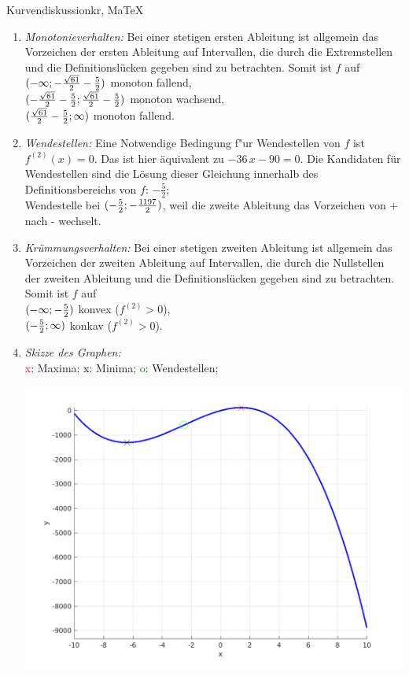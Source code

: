 \begin{MAufgabe}{Kurvendiskussion}{kr, MaTeX}
\begin{enumerate}
 \item \emph{Monotonieverhalten:} 
 Bei einer stetigen ersten Ableitung ist allgemein das Vorzeichen der ersten Ableitung auf Intervallen, die durch die Extremstellen und die Definitionsl\"ucken gegeben sind zu betrachten. Somit ist $f$ auf \\ 
 $(-\infty; - \frac{\sqrt{61}}{2} - \frac{5}{2})$ monoton fallend, \\ 
 $( - \frac{\sqrt{61}}{2} - \frac{5}{2};\frac{\sqrt{61}}{2} - \frac{5}{2})$ monoton  wachsend, \\ 
 $(\frac{\sqrt{61}}{2} - \frac{5}{2}; \infty)$ monoton fallend. \\ 
 \item \emph{Wendestellen:} 
 Eine Notwendige Bedingung f"ur Wendestellen von $f$ ist $f^{(2)}(x)=0$. 
 Das ist hier \"aquivalent zu $ - 36\, x - 90=0$. 
 Die Kandidaten f\"ur Wendestellen sind die L\"osung dieser Gleichung innerhalb des Definitionsbereichs von $f$: $- \frac{5}{2}$; \\ 
 Wendestelle bei $(- \frac{5}{2};- \frac{1197}{2})$, weil die zweite Ableitung das Vorzeichen von + nach - wechselt. \\ 
 \item \emph{Kr\"ummungsverhalten:} 
 Bei einer stetigen zweiten Ableitung ist allgemein das Vorzeichen der zweiten Ableitung auf Intervallen, die durch die Nullstellen der zweiten Ableitung und die Definitionsl\"ucken gegeben sind zu betrachten. 
 Somit ist $f$ auf \\ 
 $(-\infty ;- \frac{5}{2})$  konvex ($f^{(2)}>0$), \\ 
 $(- \frac{5}{2}; \infty)$  konkav ($f^{(2)}>0$). \\ 
 \item \emph{Skizze des Graphen:} \\ 
 {\textcolor{red} x}: Maxima; {\textcolor{black} x}: Minima; {\textcolor{green} o}: Wendestellen; 
  \begin{center}
  \includegraphics[width=0.8\linewidth]{Abb_zur_Ag_autogenerated_fractions_27.png} \end{center}
  
 \end{enumerate}
 \else\relax\fi
  \end{MAufgabe}
